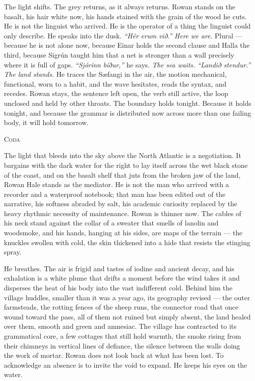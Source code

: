 \documentclass[11pt,oneside]{book}
\begin{document}
The light shifts. The grey returns, as it always returns. Rowan stands
on the basalt, his hair white now, his hands stained with the grain of
the wood he cuts. He is not the linguist who arrived. He is the operator
of a thing the linguist could only describe. He speaks into the dusk.
\emph{``Hér erum við.''} \emph{Here we are.} Plural --- because he is
not alone now, because Einar holds the second clause and Halla the
third, because Sigrún taught him that a net is stronger than a wall
precisely where it is full of gaps. \emph{``Sjórinn bíður,''} he says.
\emph{The sea waits.} \emph{``Landið stendur.''} \emph{The land stands.}
He traces the Sæfangi in the air, the motion mechanical, functional,
worn to a habit, and the wave hesitates, reads the syntax, and recedes.
Rowan stays, the sentence left open, the verb still active, the loop
unclosed and held by other throats. The boundary holds tonight. Because
it holds tonight, and because the grammar is distributed now across more
than one failing body, it will hold tomorrow.

\clearpage
\thispagestyle{fancy}
\vspace*{2.5\baselineskip}
\begin{center}
\fontsize{11}{13}\selectfont\scshape Coda
\end{center}
\vspace{2.2\baselineskip}
\noindent

The light that bleeds into the sky above the North Atlantic is a
negotiation. It bargains with the dark water for the right to lay itself
across the wet black stone of the coast, and on the basalt shelf that
juts from the broken jaw of the land, Rowan Hale stands as the mediator.
He is not the man who arrived with a recorder and a waterproof notebook;
that man has been edited out of the narrative, his softness abraded by
salt, his academic curiosity replaced by the heavy rhythmic necessity of
maintenance. Rowan is thinner now. The cables of his neck stand against
the collar of a sweater that smells of lanolin and woodsmoke, and his
hands, hanging at his sides, are maps of the terrain --- the knuckles
swollen with cold, the skin thickened into a hide that resists the
stinging spray.

He breathes. The air is frigid and tastes of iodine and ancient decay,
and his exhalation is a white plume that drifts a moment before the wind
takes it and disperses the heat of his body into the vast indifferent
cold. Behind him the village huddles, smaller than it was a year ago,
its geography revised --- the outer farmsteads, the rotting fences of
the sheep runs, the connector road that once wound toward the pass, all
of them not ruined but simply absent, the land healed over them, smooth
and green and amnesiac. The village has contracted to its grammatical
core, a few cottages that still hold warmth, the smoke rising from their
chimneys in vertical lines of defiance, the silence between the walls
doing the work of mortar. Rowan does not look back at what has been
lost. To acknowledge an absence is to invite the void to expand. He
keeps his eyes on the water.
\end{document}
